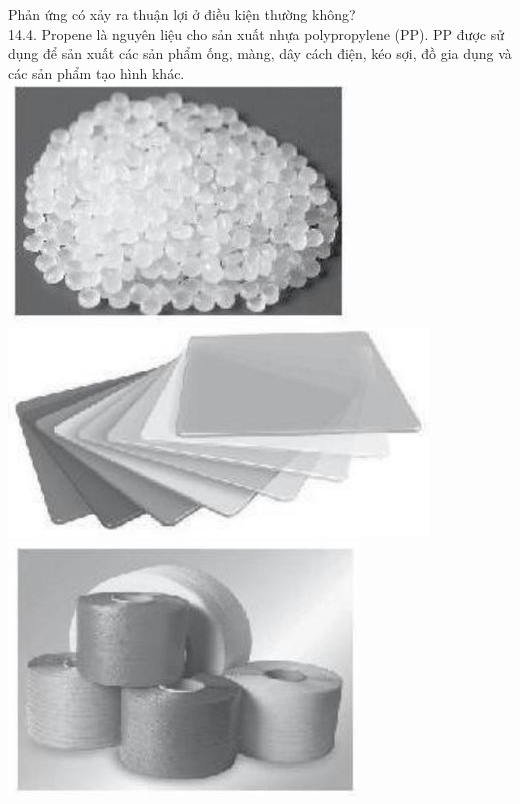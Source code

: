 \documentclass[10pt]{article}
\begin{document}
Phản ứng có xảy ra thuận lợi ở điều kiện thường không?\\
14.4. Propene là nguyên liệu cho sản xuất nhựa polypropylene (PP). PP được sử dụng để sản xuất các sản phẩm ống, màng, dây cách điện, kéo sợi, đồ gia dụng và các sản phẩm tạo hình khác.\\
\includegraphics[max width=\textwidth, center]{2025_10_23_883c4b146e2332109fcdg-51(2)}\\
\includegraphics[max width=\textwidth, center]{2025_10_23_883c4b146e2332109fcdg-51(1)}\\
\includegraphics[max width=\textwidth, center]{2025_10_23_883c4b146e2332109fcdg-51}
\end{document}
